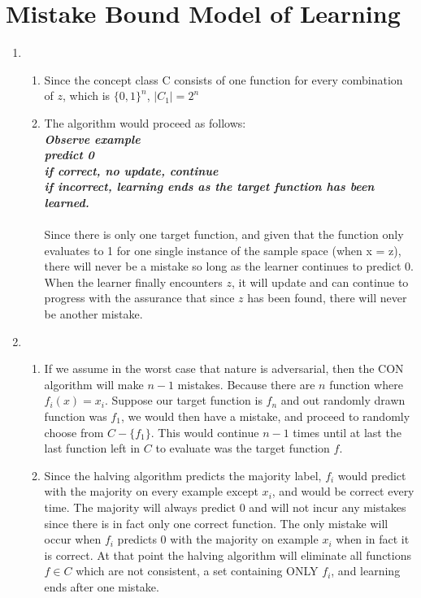\documentclass[11pt,a4paper]{article}
\begin{document}
	\section{Mistake Bound Model of Learning}
		\begin{enumerate}
			\item $ $
			\begin{enumerate}
				\item Since the concept class C consists of one function for every combination of $z$, which is $\{0,1\}^n$, $\vert C_1 \vert = 2^n$ 
				\item The algorithm would proceed as follows:\\
				\textit{\textbf{Observe example \\
				predict 0\\
				if correct, no update, continue\\
				if incorrect, learning ends as the  target function has been learned.}}\\ \\
				Since there is only one target function, and given that the function only evaluates to 1 for one single instance of the sample space (when x = z), there will never be a mistake so long as the learner continues to predict 0. When the learner finally encounters $z$, it will update and can continue to progress with the assurance that since $z$ has been found, there will never be another mistake. 
			\end{enumerate}
			\item $ $
			\begin{enumerate}
				\item If we assume in the worst case that nature is adversarial, then the CON algorithm will make $n-1$ mistakes. Because there are $n$ function where $f_i(x) = x_i$. Suppose our target function is $f_n$ and out randomly drawn function was $f_1$, we would then have a mistake, and proceed to randomly choose from $C - \{f_1\}$. This would continue $n-1$ times until at last the last function left in $C$ to evaluate was the target function $f$.
				\item Since the halving algorithm predicts the majority label, $f_i$ would predict with the majority on every example except $x_i$, and would be correct every time. The majority will always predict 0 and will not incur any mistakes since there is in fact only one correct function. The only mistake will occur when $f_i$ predicts 0 with the majority on example $x_i$ when in fact it is correct. At that point the halving algorithm will eliminate all functions $f\in C$ which are not consistent, a set containing ONLY $f_i$, and learning ends after one mistake.
			\end{enumerate}
		\end{enumerate}
	
\end{document}
